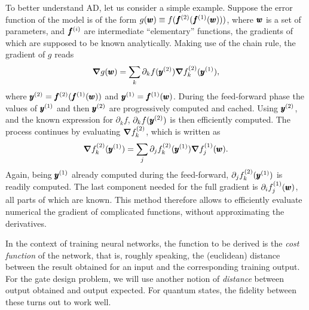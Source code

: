 To better understand \ac{AD}, let us consider a simple example.
Suppose the error function of the model is of the form
$g(\pmb{w})\equiv f(\pmb{f}^{(2)}(\pmb{f}^{(1)}(\pmb{w})))$,
where $\pmb{w}$ is a set of parameters, and $\pmb{f}^{(i)}$ are intermediate ``elementary'' functions, the gradients of which are supposed to be known analytically.
Making use of the chain rule, the gradient of $g$ reads
\begin{equation}
\begin{split}
	\grad g(\pmb{w}) =
	\sum_{k} \partial_{k} f(\pmb{y}^{(2)})
	\grad f_{k}^{(2)}(\pmb{y}^{(1)}),
\end{split}
\label{eq:grad_nested_f}
\end{equation}
where $\pmb{y}^{(2)} = \pmb{f}^{(2)}(\pmb{f}^{(1)}(\pmb{w}))$ and
$\pmb{y}^{(1)} = \pmb{f}^{(1)}(\pmb{w})$.
During the feed-forward phase the values of $\pmb{y}^{(1)}$ and then $\pmb{y}^{(2)}$ are progressively computed and cached.
Using $\pmb{y}^{(2)}$, and the known expression for $\partial_k f$, $\partial_{k} f(\pmb{y}^{(2)})$ is then efficiently computed.
The process continues by evaluating $\grad f_k^{(2)}$, which is written as
\begin{equation}
	\grad f_k^{(2)}(\pmb{y}^{(1)}) =
	\sum_j \partial_j f_k^{(2)}(\pmb{y}^{(1)}) \grad f_j^{(1)}(\pmb{w}).
\end{equation}
Again, being $\pmb{y}^{(1)}$ already computed during the feed-forward, $\partial_j f_k^{(2)}(\pmb{y}^{(1)})$ is readily computed.
The last component needed for the full gradient is $\partial_i f_j^{(1)}(\pmb{w})$, all parts of which are known.
This method therefore allows to efficiently evaluate numerical the gradient of complicated functions, without approximating the derivatives.

In the context of training neural networks, the function to be derived is the \emph{cost function} of the network, that is, roughly speaking, the (euclidean) distance between the result obtained for an input and the corresponding training output.
For the gate design problem, we will use another notion of \emph{distance} between output obtained and output expected.
For quantum states, the fidelity between these turns out to work well.

